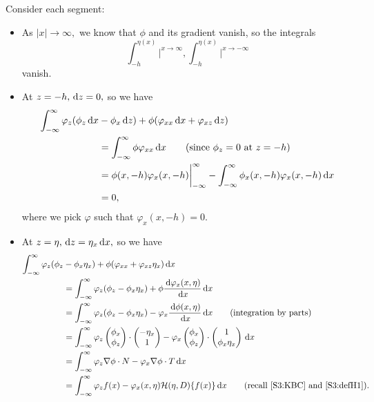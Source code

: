 Consider each segment:
\begin{itemize}
\item As $|x|\to \infty,$ we know that $\phi$ and its gradient vanish, so the integrals
\[  \int_{-h}^{\eta(x)} \bigg|^{x \to \infty}, \int^{\eta(x)}_{-h} \bigg|^{x \to -\infty}\]
vanish.
\item At $z = -h, \,\mathrm{d} z = 0,$ so we have 
\begin{align*}
\int^{\infty}_{-\infty}\varphi_z (\phi_z \,\mathrm{d} x &- \phi_x \,\mathrm{d} z) + \phi(\varphi_{xx} \,\mathrm{d} x + \varphi_{xz} \,\mathrm{d} z) \\
&= \int^{\infty}_{-\infty} \phi \varphi_{xx} \,\mathrm{d} x \qquad \text{(since $\phi_z=0$ at $z =-h$)} \\
&= \phi(x,-h) \varphi_x(x, -h) \bigg|^{\infty}_{-\infty} - \int^{\infty}_{-\infty} \phi_x(x,-h)\varphi_x(x,-h) \,\mathrm{d} x \\
&= 0,
\end{align*}
where we pick $\varphi$ such that $\varphi_x(x, -h) = 0.$
\item At $z = \eta, \,\mathrm{d} z = \eta_x \,\mathrm{d} x,$ so we have 
\begin{align*}
\int_{-\infty}^{\infty} \varphi_z(\phi_z &- \phi_x \eta_x) + \phi(\varphi_{xx}  +  \varphi_{xz} \eta_x) \,\mathrm{d} x \\
&= \int_{-\infty}^{\infty} \varphi_z(\phi_z - \phi_x \eta_x)+ \phi \dfrac{\,\mathrm{d} \varphi_x(x, \eta)}{\,\mathrm{d} x} \,\mathrm{d} x \\
&= \int_{-\infty}^{\infty} \varphi_z (\phi_z - \phi_x \eta_x) -\varphi_x \dfrac{\,\mathrm{d} \phi(x, \eta)}{\,\mathrm{d} x} \,\mathrm{d} x \qquad \text{(integration by parts)}\\
&= \int_{-\infty}^{\infty} \varphi_z \begin{pmatrix} \phi_x  \\ \phi_z \end{pmatrix}\cdot \begin{pmatrix} - \eta_x \\ 1 \end{pmatrix}  -\varphi_x \begin{pmatrix} \phi_x  \\ \phi_z \end{pmatrix} \cdot \begin{pmatrix} 1 \\ \phi_x \eta_x \end{pmatrix} \,\mathrm{d} x \\
&= \int_{-\infty}^{\infty} \varphi_z \nabla \phi \cdot N -\varphi_x \nabla \phi \cdot T \,\mathrm{d} x \\
&= \int_{-\infty}^{\infty} \varphi_z f(x) -\varphi_x(x, \eta) \mathcal{H}( \eta, D)\{ f(x) \} \,\mathrm{d} x \qquad \text{(recall \eqref{S3:KBC} and \eqref{S3:defH1})}. 
\end{align*}
\end{itemize}
